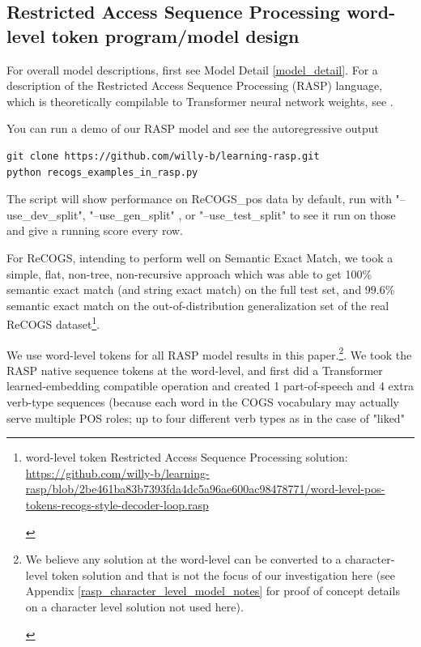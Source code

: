 \documentclass[11pt]{article}
\begin{document}
\clearpage
\twocolumn
\subsection{Restricted Access Sequence Processing word-level token program/model design}
\label{rasp-word-level-model-design}

For overall model descriptions, first see Model Detail \ref{model_detail}.
For a description of the Restricted Access Sequence Processing (RASP) language, which is theoretically compilable to Transformer neural network weights, see \citep{Weiss2021}.

You can run a demo of our RASP model and see the autoregressive output 

\begin{tiny}
\begin{verbatim}
git clone https://github.com/willy-b/learning-rasp.git
python recogs_examples_in_rasp.py 
\end{verbatim}
\end{tiny}

The script will show performance on \citep{Wu2023} ReCOGS\_pos data by default, run with "--use\_dev\_split", "--use\_gen\_split" , or "--use\_test\_split" to see it run on those and give a running score every row.

For ReCOGS, intending to perform well on Semantic Exact Match, we took a simple, flat, non-tree, non-recursive approach which was able to get 100\% semantic exact match (and string exact match) on the full test set, and 99.6\% semantic exact match on the out-of-distribution generalization set of the real ReCOGS dataset\footnote{\begin{footnotesize}word-level token Restricted Access Sequence Processing solution: \href{https://github.com/willy-b/learning-rasp/blob/2be461ba83b7393fda4dc5a96ae600ac98478771/word-level-pos-tokens-recogs-style-decoder-loop.rasp}{https://github.com/willy-b/learning-rasp/blob/2be461ba83b7393fda4dc5a96ae600ac98478771/word-level-pos-tokens-recogs-style-decoder-loop.rasp} \end{footnotesize}}.

We use word-level tokens for all RASP model results in this paper.\footnote{\begin{footnotesize}We believe any solution at the word-level can be converted to a character-level token solution and that is not the focus of our investigation here (see Appendix \ref{rasp_character_level_model_notes} for proof of concept details on a character level solution not used here).\end{footnotesize}}. We took the RASP native sequence tokens at the word-level, and first did a Transformer learned-embedding compatible operation and created 1 part-of-speech and 4 extra verb-type sequences (because each word in the COGS vocabulary may actually serve multiple POS roles; up to four different verb types as in the case of "liked" 
\end{document}
